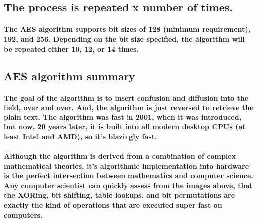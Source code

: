 \subsection{The process is repeated x number of times.}
\paragraph{The AES algorithm supports bit sizes of 128 (minimum requirement), 192, and 256. Depending on the bit size specified, the algorithm will be repeated either 10, 12, or 14 times.}



\subsection{AES algorithm summary}
\paragraph{The goal of the algorithm is to insert confusion and diffusion into the field, over and over. And, the algorithm is just reversed to retrieve the plain text. The algorithm was fast in 2001, when it was introduced, but now, 20 years later, it is built into all modern desktop CPUs (at least Intel and AMD), so it's blazingly fast.}

\paragraph{Although the algorithm is derived from a combination of complex mathematical theories, it's algorithmic implementation into hardware is the perfect intersection between mathematics and computer science. Any computer scientist can quickly assess from the images above, that the XORing, bit shifting, table lookups, and bit permutations are exactly the kind of operations that are executed super fast on computers.}\cite[p. 178]{Dooley}


